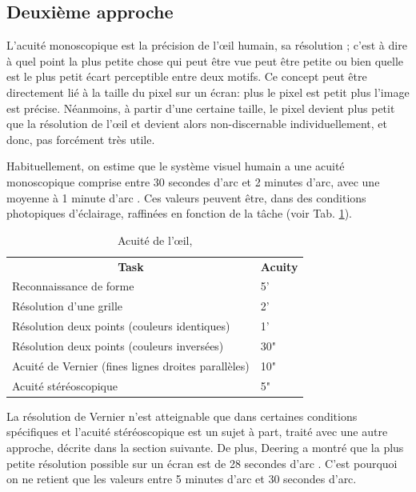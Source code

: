 	\subsection{Deuxième approche}
	\par L'acuité monoscopique est la précision de l'œil humain, sa résolution ; c'est à dire à quel point la plus petite chose qui peut être vue peut être petite ou bien quelle est le plus petit écart perceptible entre deux motifs. Ce concept peut être directement lié à la taille du pixel sur un écran: plus le pixel est petit plus l'image est précise. Néanmoins, à partir d'une certaine taille, le pixel devient plus petit que la résolution de l'œil et devient alors non-discernable individuellement, et donc, pas forcément très utile.
	
	\par Habituellement, on estime que le système visuel humain a une acuité monoscopique comprise entre 30 secondes d'arc et 2 minutes d'arc, avec une moyenne à 1 minute d'arc \citep{fuchs_traite_2003}. Ces valeurs peuvent être, dans des conditions photopiques d'éclairage, raffinées en fonction de la tâche \citep{gross_human_2008} (voir Tab. \ref{tab:acuity}).

	\begin{table}[h]
		\centering
		\caption{Acuité de l'œil, \citep{gross_human_2008}}
		\label{tab:acuity}
		\small
		\begin{tabular}{ll}
			\multicolumn{1}{c}{\bfseries Task} & \multicolumn{1}{c}{\bfseries Acuity}\\
			Reconnaissance de forme & 5'\\
			Résolution d'une grille & 2'\\
			Résolution deux points (couleurs identiques) & 1'\\
			Résolution deux points (couleurs inversées) & 30"\\
			Acuité de Vernier (fines lignes droites parallèles) & 10"\\
			Acuité stéréoscopique & 5"\\
		\end{tabular}
	\end{table}
	
	\par La résolution de Vernier n'est atteignable que dans certaines conditions spécifiques et l'acuité stéréoscopique est un sujet à part, traité avec une autre approche, décrite dans la section suivante. De plus, Deering a montré que la plus petite résolution possible sur un écran est de 28 secondes d'arc \citep{deering_limits_1998}. C'est pourquoi on ne retient que les valeurs entre 5 minutes d'arc et 30 secondes d'arc.
	

